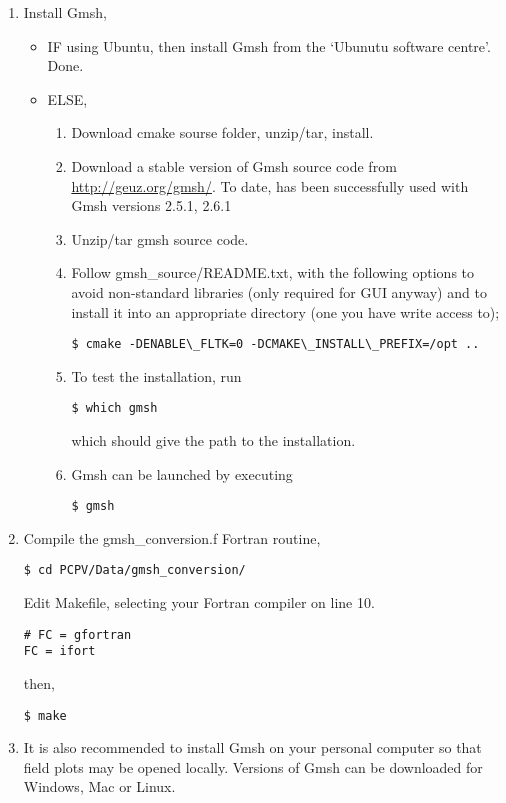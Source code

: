 \documentclass[11pt,a4paper,twoside]{report}
\begin{document}
\begin{enumerate}
\item Install Gmsh,
\begin{itemize}
\item IF using Ubuntu, then install Gmsh from the `Ubunutu software centre'. Done.

\item ELSE, 

\begin{enumerate}
\item Download cmake sourse folder, unzip/tar, install.
\item Download a stable version of Gmsh source code from \href{http://geuz.org/gmsh/}{http://geuz.org/gmsh/}.
To date, \CodeName has been successfully used with Gmsh versions 2.5.1, 2.6.1
\item Unzip/tar gmsh source code. 
\item Follow gmsh\_source/README.txt, with the following options to avoid non-standard libraries (only required for GUI anyway) and to install it into an appropriate directory (one you have write access to);
\begin{lstlisting}
$ cmake -DENABLE\_FLTK=0 -DCMAKE\_INSTALL\_PREFIX=/opt ..
\end{lstlisting}

\item To test the installation, run
\begin{lstlisting}
$ which gmsh 
\end{lstlisting}
which should give the path to the installation.

\item Gmsh can be launched by executing
\begin{lstlisting}
$ gmsh
\end{lstlisting}

\end{enumerate}
\end{itemize}


\item Compile the gmsh\_conversion.f Fortran routine,

\begin{lstlisting}
$ cd PCPV/Data/gmsh_conversion/
\end{lstlisting}

Edit Makefile, selecting your Fortran compiler on line 10.
  
\begin{lstlisting}
# FC = gfortran
FC = ifort
\end{lstlisting}

then,

\begin{lstlisting}
$ make
\end{lstlisting}


\item It is also recommended to install Gmsh on your personal computer so that field plots may be opened locally. Versions of Gmsh can be downloaded for Windows, Mac or Linux.

\end{enumerate}
\end{document}
